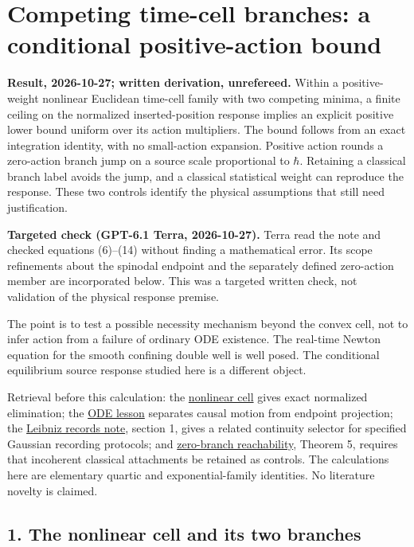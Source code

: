 \documentclass[11pt,a4paper]{article}
\begin{document}
\section{Competing time-cell branches: a conditional positive-action
bound}\label{competing-time-cell-branches-a-conditional-positive-action-bound}

\textbf{Result, 2026-10-27; written derivation, unrefereed.} Within a
positive-weight nonlinear Euclidean time-cell family with two competing
minima, a finite ceiling on the normalized inserted-position response
implies an explicit positive lower bound uniform over its action
multipliers. The bound follows from an exact integration identity, with
no small-action expansion. Positive action rounds a zero-action branch
jump on a source scale proportional to \(\hbar\). Retaining a classical
branch label avoids the jump, and a classical statistical weight can
reproduce the response. These two controls identify the physical
assumptions that still need justification.

\textbf{Targeted check (GPT-6.1 Terra, 2026-10-27).} Terra read the note
and checked equations (6)--(14) without finding a mathematical error.
Its scope refinements about the spinodal endpoint and the separately
defined zero-action member are incorporated below. This was a targeted
written check, not validation of the physical response premise.

The point is to test a possible necessity mechanism beyond the convex
cell, not to infer action from a failure of ordinary ODE existence. The
real-time Newton equation for the smooth confining double well is well
posed. The conditional equilibrium source response studied here is a
different object.

Retrieval before this calculation: the
\href{newton-nonlinear-time-cell.md}{nonlinear cell} gives exact
normalized elimination; the \href{balaban-ode-lesson.md}{ODE lesson}
separates causal motion from endpoint projection; the
\href{leibniz-continuity-records.md}{Leibniz records note}, section 1,
gives a related continuity selector for specified Gaussian recording
protocols; and \href{zero-branch-reachability.md}{zero-branch
reachability}, Theorem 5, requires that incoherent classical attachments
be retained as controls. The calculations here are elementary quartic
and exponential-family identities. No literature novelty is claimed.

\subsection{1. The nonlinear cell and its two
branches}\label{the-nonlinear-cell-and-its-two-branches}
\end{document}
